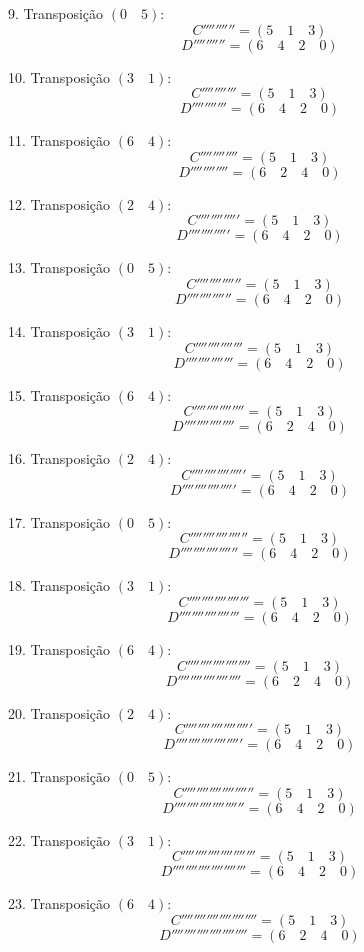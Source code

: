 9. Transposição $(0 \quad 5)$:
   \[ C'''''''''' = (5 \quad 1 \quad 3) \]
   \[ D'''''''''' = (6 \quad 4 \quad 2 \quad 0) \]

10. Transposição $(3 \quad 1)$:
    \[ C''''''''''' = (5 \quad 1 \quad 3) \]
    \[ D''''''''''' = (6 \quad 4 \quad 2 \quad 0) \]

11. Transposição $(6 \quad 4)$:
    \[ C'''''''''''' = (5 \quad 1 \quad 3) \]
    \[ D'''''''''''' = (6 \quad 2 \quad 4 \quad 0) \]

12. Transposição $(2 \quad 4)$:
    \[ C''''''''''''' = (5 \quad 1 \quad 3) \]
    \[ D''''''''''''' = (6 \quad 4 \quad 2 \quad 0) \]

13. Transposição $(0 \quad 5)$:
    \[ C'''''''''''''' = (5 \quad 1 \quad 3) \]
    \[ D'''''''''''''' = (6 \quad 4 \quad 2 \quad 0) \]

14. Transposição $(3 \quad 1)$:
    \[ C''''''''''''''' = (5 \quad 1 \quad 3) \]
    \[ D''''''''''''''' = (6 \quad 4 \quad 2 \quad 0) \]

15. Transposição $(6 \quad 4)$:
    \[ C'''''''''''''''' = (5 \quad 1 \quad 3) \]
    \[ D'''''''''''''''' = (6 \quad 2 \quad 4 \quad 0) \]

16. Transposição $(2 \quad 4)$:
    \[ C''''''''''''''''' = (5 \quad 1 \quad 3) \]
    \[ D''''''''''''''''' = (6 \quad 4 \quad 2 \quad 0) \]

17. Transposição $(0 \quad 5)$:
    \[ C'''''''''''''''''' = (5 \quad 1 \quad 3) \]
    \[ D'''''''''''''''''' = (6 \quad 4 \quad 2 \quad 0) \]

18. Transposição $(3 \quad 1)$:
    \[ C''''''''''''''''''' = (5 \quad 1 \quad 3) \]
    \[ D''''''''''''''''''' = (6 \quad 4 \quad 2 \quad 0) \]

19. Transposição $(6 \quad 4)$:
    \[ C'''''''''''''''''''' = (5 \quad 1 \quad 3) \]
    \[ D'''''''''''''''''''' = (6 \quad 2 \quad 4 \quad 0) \]

20. Transposição $(2 \quad 4)$:
    \[ C''''''''''''''''''''' = (5 \quad 1 \quad 3) \]
    \[ D''''''''''''''''''''' = (6 \quad 4 \quad 2 \quad 0) \]

21. Transposição $(0 \quad 5)$:
    \[ C'''''''''''''''''''''' = (5 \quad 1 \quad 3) \]
    \[ D'''''''''''''''''''''' = (6 \quad 4 \quad 2 \quad 0) \]

22. Transposição $(3 \quad 1)$:
    \[ C''''''''''''''''''''''' = (5 \quad 1 \quad 3) \]
    \[ D''''''''''''''''''''''' = (6 \quad 4 \quad 2 \quad 0) \]

23. Transposição $(6 \quad 4)$:
    \[ C'''''''''''''''''''''''' = (5 \quad 1 \quad 3) \]
    \[ D'''''''''''''''''''''''' = (6 \quad 2 \quad 4 \quad 0) \]

